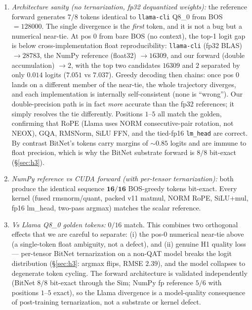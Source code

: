 \documentclass{article}
\begin{document}
\begin{enumerate}
  \item \emph{Architecture sanity (no ternarization, fp32 dequantized
    weights):} the reference forward generates $7/8$ tokens identical
    to \texttt{llama-cli} {Q8\_0} from {BOS}$=128000$. The single
    divergence is the \emph{first} token, and it is not a bug but a
    numerical near-tie. At pos $0$ from bare {BOS} (no context), the
    top-1 logit gap is below cross-implementation float reproducibility:
    \texttt{llama-cli} (fp32 {BLAS}) $\to 28783$, the NumPy reference
    (float32) $\to 16309$, and our forward (double accumulation) $\to 2$,
    with the top two candidates $16309$ and $2$ separated by only
    $0.014$ logits ($7.051$ vs $7.037$). Greedy decoding then chains:
    once pos $0$ lands on a different member of the near-tie, the whole
    trajectory diverges, and each implementation is internally
    self-consistent (none is ``wrong''). Our double-precision path is
    in fact \emph{more} accurate than the fp32 references; it simply
    resolves the tie differently. Positions $1$--$5$ all match the
    golden, confirming that {RoPE} (Llama uses {NORM} consecutive-pair
    rotation, not {NEOX}), {GQA}, RMSNorm, SiLU FFN, and the tied-fp16
    \texttt{lm\_head} are correct. By contrast BitNet's tokens carry
    margins of $\sim 0.85$ logits and are immune to float precision,
    which is why the BitNet substrate forward is $8/8$ bit-exact
    (\S\ref{sec:h3}).
  \item \emph{NumPy reference vs CUDA forward (with per-tensor
    ternarization):} both produce the identical sequence
    $\mathbf{16/16}$ {BOS}-greedy tokens bit-exact. Every kernel
    (fused rmsnorm/quant, packed v11 matmul, NORM RoPE, SiLU+mul,
    fp16 lm\_head, two-pass argmax) matches the scalar reference.
  \item \emph{Vs Llama {Q8\_0} golden tokens:} $0/16$ match. This
    combines two orthogonal effects that we are careful to separate:
    (i) the pos-$0$ numerical near-tie above (a single-token float
    ambiguity, not a defect), and (ii) genuine H1 quality loss---
    per-tensor BitNet ternarization on a non-{QAT} model breaks the
    logit distribution (\S\ref{sec:h3}: argmax flips, {RMSE} $2.39$),
    and the model collapses to degenerate token cycling. The forward
    architecture is validated independently (BitNet $8/8$ bit-exact
    through the {Sim}; NumPy fp reference $5/6$ with positions $1$--$5$
    exact), so the Llama divergence is a model-quality consequence of
    post-training ternarization, not a substrate or kernel defect.
\end{enumerate}
\end{document}
